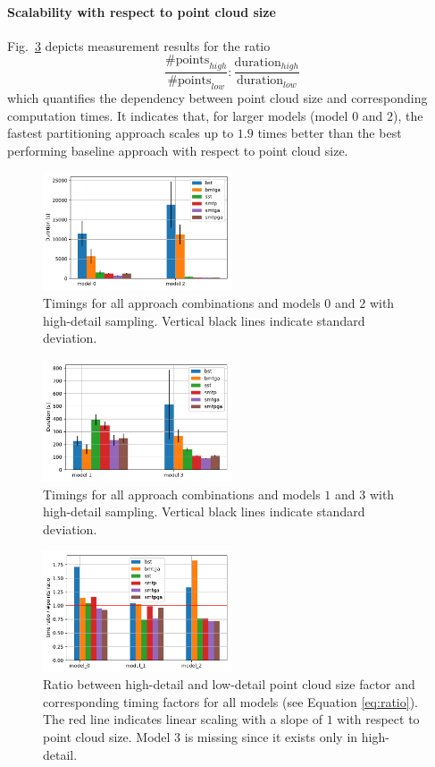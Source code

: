 \paragraph{Scalability with respect to point cloud size}  
Fig.~\ref{fig:graph3} depicts measurement results for the ratio
\begin{equation} \label{eq:ratio}
\frac{\#\text{points}_{high}}{\#\text{points}_{low}} : \frac{\text{duration}_{high}}{\text{duration}_{low}}
\end{equation}
which quantifies the dependency between point cloud size and corresponding computation times.
It indicates that, for larger models (model $0$ and $2$), the fastest partitioning approach scales up to $1.9$ times better than the best performing baseline approach with respect to point cloud size.
\begin{figure}[htb]
	\centering
	\includegraphics[width=0.5\textwidth]{figures/g1.pdf}
	\caption{Timings for all approach combinations and models $0$ and $2$ with high-detail sampling. Vertical black lines indicate standard deviation.}
	\label{fig:graph1}
\end{figure}
\begin{figure}[htb]
	\centering
	\includegraphics[width=0.5\textwidth]{figures/g4.pdf}
	\caption{Timings for all approach combinations and models  $1$ and $3$ with high-detail sampling. Vertical black lines indicate standard deviation.}
	\label{fig:graph4}
\end{figure}
\begin{figure}[htb]
	\centering
	\includegraphics[width=0.5\textwidth]{figures/g3.pdf}
	\caption{Ratio between high-detail and low-detail point cloud size factor and corresponding timing factors for all models (see Equation \ref{eq:ratio}). The red line indicates linear scaling with a slope of $1$ with respect to point cloud size. Model $3$ is missing since it exists only in high-detail.}
	\label{fig:graph3}
\end{figure}

